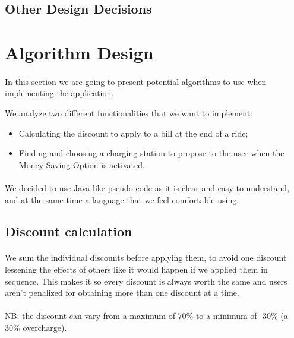 \documentclass[english]{article}
\begin{document}
\begin{itemize}
\subsection{Other Design Decisions}

\newpage

\section{Algorithm Design}

\paragraph{}
In this section we are going to present potential algorithms to use when implementing the application.

We analyze two different functionalities that we want to implement:
\begin{itemize}
	\item{Calculating the discount to apply to a bill at the end of a ride;}
	\item{Finding and choosing a charging station to propose to the user when the Money Saving Option is activated.}
\end{itemize}

\paragraph{}
We decided to use Java-like pseudo-code as it is clear and easy to understand, and at the same time a language that we feel comfortable using.

\subsection{Discount calculation}



\paragraph{}
We sum the individual discounts before applying them, to avoid one discount lessening the effects of others like it would happen if we applied them in sequence. This makes it so every discount is always worth the same and users aren't penalized for obtaining more than one discount at a time.

\paragraph{}
NB: the discount can vary from a maximum of 70\% to a minimum of -30\% (a 30\% overcharge).


\end{itemize}
\end{document}
